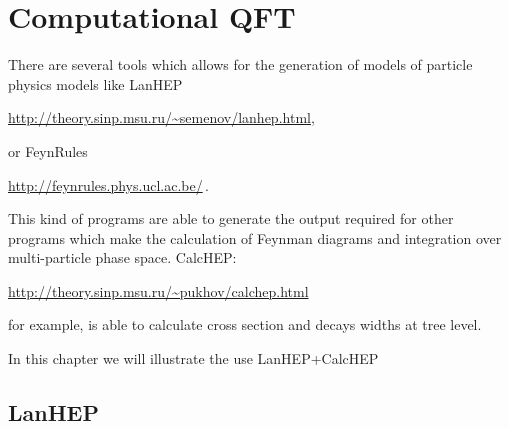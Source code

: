 \chapter{Computational QFT}

\begin{frame}
There are several tools which allows for the generation of models of particle physics models like LanHEP \cite{Semenov:2008jy} 
\begin{center}
  \url{http://theory.sinp.msu.ru/~semenov/lanhep.html},
\end{center}
or FeynRules \cite{Christensen:2008py}
\begin{center}
  \url{http://feynrules.phys.ucl.ac.be/}\,.
\end{center}

This kind of programs are able to generate the output required for other programs which make the calculation of Feynman diagrams and integration over multi-particle phase space. CalcHEP:
\begin{center}
  \url{http://theory.sinp.msu.ru/~pukhov/calchep.html}
\end{center}
for example, is able to calculate cross section and decays widths at tree level.

\end{frame}

In this chapter we will illustrate the use LanHEP+CalcHEP

\section{LanHEP}

